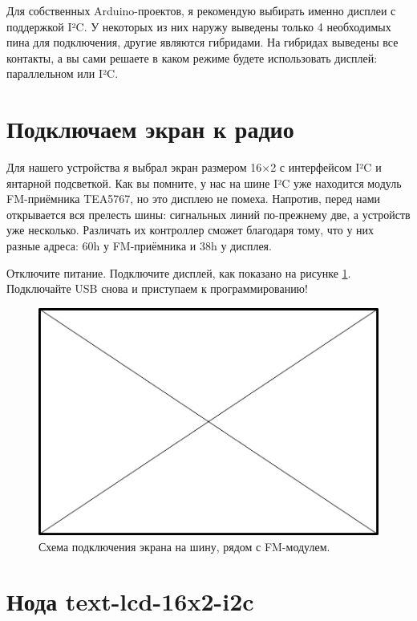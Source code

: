Для собственных Arduino-проектов, я рекомендую выбирать именно дисплеи с поддержкой I²C. У некоторых из них наружу выведены только 4 необходимых пина для подключения, другие являются гибридами. На гибридах выведены все контакты, а вы сами решаете в каком режиме будете использовать дисплей: параллельном или I²C.

\section{Подключаем экран к радио}

Для нашего устройства я выбрал экран размером 16×2 с интерфейсом I²C и янтарной подсветкой. Как вы помните, у нас на шине I²C уже находится модуль FM-приёмника TEA5767, но это дисплею не помеха. Напротив, перед нами открывается вся прелесть шины: сигнальных линий по-прежнему две, а устройств уже несколько. Различать их контроллер сможет благодаря тому, что у них разные адреса: 60h у FM-приёмника и 38h у дисплея.

Отключите питание. Подключите дисплей, как показано на рисунке \ref{fig:text-lcd-radio-wiring}. Подключайте USB снова и приступаем к программированию!

\begin{figure}
  \centering
  \includegraphics{TODO}
  \caption{Схема подключения экрана на шину, рядом с FM-модулем.}
  \label{fig:text-lcd-radio-wiring}
\end{figure}

\section{Нода text-lcd-16x2-i2c}

